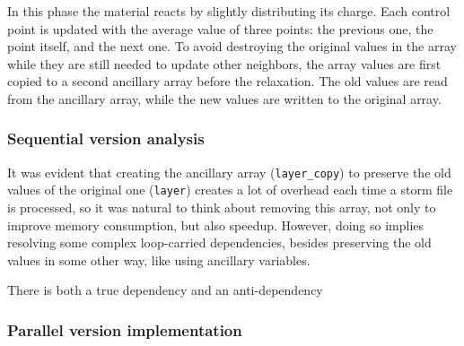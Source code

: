 In this phase the material reacts by slightly distributing its charge. Each control point is updated with the average value of three points: the previous one, the point itself, and the next one. To avoid destroying the original values in the array while they are still needed to update other neighbors, the array values are first copied to a second ancillary array before the relaxation. The old values are read from the ancillary array, while the new values are written to the original array.
\subsubsection{Sequential version analysis}
It was evident that creating the ancillary array (\verb|layer_copy|) to preserve the old values of the original one (\verb|layer|) creates a lot of overhead each time a storm file is processed, so it was natural to think about removing this array, not only to improve memory consumption, but also speedup. However, doing so implies resolving some complex loop-carried dependencies, besides preserving the old values in some other way, like using ancillary variables.
\par There is both a true dependency and an anti-dependency

\subsubsection{Parallel version implementation}